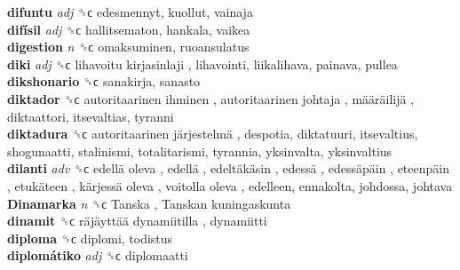 \textbf{difuntu} \emph{adj}  ␝ϲ  edesmennyt, kuollut, vainaja  \\
\textbf{difísil} \emph{adj}  ␝ϲ  hallitsematon, hankala, vaikea  \\
\textbf{digestion} \emph{n}  ␝ϲ  omaksuminen, ruoansulatus  \\
\textbf{diki} \emph{adj}  ␝ϲ   lihavoitu kirjasinlaji , lihavointi, liikalihava, painava, pullea  \\
\textbf{dikshonario} ␝ϲ  sanakirja, sanasto  \\
\textbf{diktador} ␝ϲ   autoritaarinen ihminen ,  autoritaarinen johtaja ,  määräilijä , diktaattori, itsevaltias, tyranni  \\
\textbf{diktadura} ␝ϲ   autoritaarinen järjestelmä , despotia, diktatuuri, itsevaltius, shogunaatti, stalinismi, totalitarismi, tyrannia, yksinvalta, yksinvaltius  \\
\textbf{dilanti} \emph{adv}  ␝ϲ   edellä oleva ,  edellä ,  edeltäkäsin ,  edessä ,  edessäpäin ,  eteenpäin ,  etukäteen ,  kärjessä oleva ,  voitolla oleva , edelleen, ennakolta, johdossa, johtava  \\
\textbf{Dinamarka} \emph{n}  ␝ϲ   Tanska ,  Tanskan kuningaskunta   \\
\textbf{dinamit} ␝ϲ   räjäyttää dynamiitilla , dynamiitti  \\
\textbf{diploma} ␝ϲ  diplomi, todistus  \\
\textbf{diplomátiko} \emph{adj}  ␝ϲ  diplomaatti  \\
